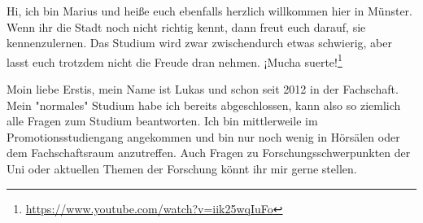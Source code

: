 \begin{multicols}{2}
\vspace{-0.3cm}

{
Hi, ich bin Marius und heiße euch ebenfalls herzlich willkommen hier in Münster. Wenn ihr die Stadt noch nicht richtig kennt, dann freut euch darauf, sie kennenzulernen. 
Das Studium wird zwar zwischendurch etwas schwierig, aber lasst euch trotzdem nicht die Freude dran nehmen. ¡Mucha suerte!\footnote{\url{https://www.youtube.com/watch?v=iik25wqIuFo}}
}

{
Moin liebe Erstis, mein Name ist Lukas und schon seit 2012 in der Fachschaft. Mein "normales" Studium habe ich bereits abgeschlossen, kann also so ziemlich alle Fragen zum Studium beantworten.
Ich bin mittlerweile im Promotionsstudiengang angekommen und bin nur noch wenig in Hörsälen oder dem Fachschaftsraum anzutreffen.
Auch Fragen zu Forschungsschwerpunkten der Uni oder aktuellen Themen der Forschung könnt ihr mir gerne stellen.
}

\vspace{-0.2cm}


\end{multicols}
